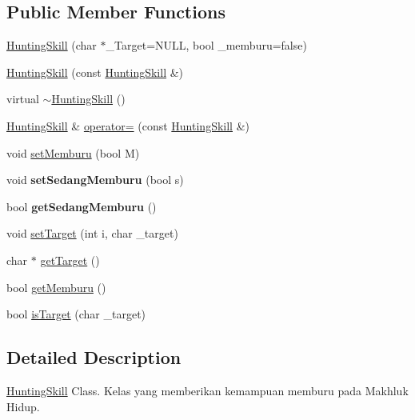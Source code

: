 \subsection*{Public Member Functions}
\begin{DoxyCompactItemize}
\item 
\hyperlink{class_hunting_skill_a6c3ca4ba2dd4f4c9cf1302088d362a6e}{Hunting\+Skill} (char $\ast$\+\_\+\+Target=N\+U\+LL, bool \+\_\+memburu=false)
\item 
\hyperlink{class_hunting_skill_a8817bc85912e00b4b431a94f32ee494e}{Hunting\+Skill} (const \hyperlink{class_hunting_skill}{Hunting\+Skill} \&)
\item 
virtual \hyperlink{class_hunting_skill_a648756f16fda66f2c68ab036dda97640}{$\sim$\+Hunting\+Skill} ()
\item 
\hyperlink{class_hunting_skill}{Hunting\+Skill} \& \hyperlink{class_hunting_skill_abd3b1e20a12499d97eb24f428be09d2d}{operator=} (const \hyperlink{class_hunting_skill}{Hunting\+Skill} \&)
\item 
void \hyperlink{class_hunting_skill_a9e00e9c4f2548ab4d25acb513625e364}{set\+Memburu} (bool M)
\item 
void {\bfseries set\+Sedang\+Memburu} (bool s)\hypertarget{class_hunting_skill_a22c57db3dc8bc1aff1d5a0bb462340bf}{}\label{class_hunting_skill_a22c57db3dc8bc1aff1d5a0bb462340bf}

\item 
bool {\bfseries get\+Sedang\+Memburu} ()\hypertarget{class_hunting_skill_a548e24e7eefc89a4ca309052da91699f}{}\label{class_hunting_skill_a548e24e7eefc89a4ca309052da91699f}

\item 
void \hyperlink{class_hunting_skill_a8616332156a56e69a9f274b296476d93}{set\+Target} (int i, char \+\_\+target)
\item 
char $\ast$ \hyperlink{class_hunting_skill_ace96396eca2bb39cddd326c2dc22243c}{get\+Target} ()
\item 
bool \hyperlink{class_hunting_skill_a1556fa4584ab19e2887e448fe5f6d34f}{get\+Memburu} ()
\item 
bool \hyperlink{class_hunting_skill_ae93d7a11c38d407d4587ef36fab47b7f}{is\+Target} (char \+\_\+target)
\end{DoxyCompactItemize}


\subsection{Detailed Description}
\hyperlink{class_hunting_skill}{Hunting\+Skill} Class. Kelas yang memberikan kemampuan memburu pada Makhluk Hidup. 

